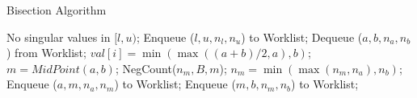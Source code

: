 \begin{algorithm}
\caption{Bisection Algorithm}
\label{alg:bisection}
\begin{algorithmic}[1]
    \State No singular values in $[l,u)$;
  \EndIf
  \State Enqueue ($l, u, n_l, n_u$) to Worklist;
    \State Dequeue ($a, b, n_a, n_b$) from Worklist;
        \State $val[i] = \min(\max((a+b)/2,a),b)$;
      \EndFor
    \Else
      \State $m = MidPoint(a,b)$;
      \State NegCount($n_m, B, m$);
      \State $n_m = \min(\max(n_m,n_a),n_b)$;
        \State Enqueue ($a, m, n_a, n_m$) to Worklist;
      \EndIf
        \State Enqueue ($m, b, n_m, n_b$) to Worklist;
      \EndIf
    \EndIf
  \EndWhile
\EndProcedure
\end{algorithmic}
\end{algorithm}
